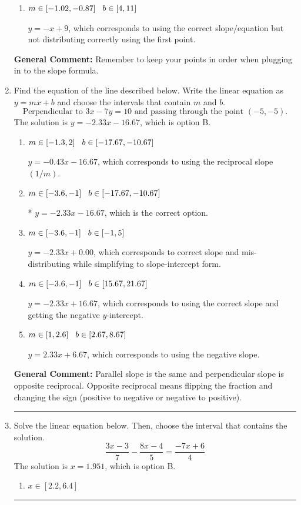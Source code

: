 \documentclass{extbook}[14pt]
\newcommand{\litem}[1]{\item #1

\rule{\textwidth}{0.4pt}}
\begin{document}
\begin{enumerate}
{\begin{enumerate}[label=\Alph*.]
 $y = -x -19$, which corresponds to using the correct slope/equation but not distributing correctly using the second point.
\item \( m \in [-1.02, -0.87] \hspace*{3mm} b \in [4, 11] \)

 $y = -x + 9$, which corresponds to using the correct slope/equation but not distributing correctly using the first point.
\end{enumerate}

\textbf{General Comment:} Remember to keep your points in order when plugging in to the slope formula.
}
\litem{
Find the equation of the line described below. Write the linear equation as $ y=mx+b $ and choose the intervals that contain $m$ and $b$.
\[ \text{Perpendicular to } 3 x - 7 y = 10 \text{ and passing through the point } (-5, -5). \]The solution is \( y = -2.33x - 16.67 \), which is option B.\begin{enumerate}[label=\Alph*.]
\item \( m \in [-1.3, 2] \hspace*{3mm} b \in [-17.67, -10.67] \)

 $y = -0.43x - 16.67$, which corresponds to using the reciprocal slope $(1/m)$.
\item \( m \in [-3.6, -1] \hspace*{3mm} b \in [-17.67, -10.67] \)

* $y = -2.33x - 16.67$, which is the correct option.
\item \( m \in [-3.6, -1] \hspace*{3mm} b \in [-1, 5] \)

 $y = -2.33x + 0.00$, which corresponds to correct slope and mis-distributing while simplifying to slope-intercept form.
\item \( m \in [-3.6, -1] \hspace*{3mm} b \in [15.67, 21.67] \)

 $y = -2.33x + 16.67$, which corresponds to using the correct slope and getting the negative $y$-intercept.
\item \( m \in [1, 2.6] \hspace*{3mm} b \in [2.67, 8.67] \)

 $y = 2.33x + 6.67$, which corresponds to using the negative slope.
\end{enumerate}

\textbf{General Comment:} Parallel slope is the same and perpendicular slope is opposite reciprocal. Opposite reciprocal means flipping the fraction and changing the sign (positive to negative or negative to positive).
}
\litem{
Solve the linear equation below. Then, choose the interval that contains the solution.
\[ \frac{3x -3}{7} - \frac{8x -4}{5} = \frac{-7x + 6}{4} \]The solution is \( x = 1.951 \), which is option B.\begin{enumerate}[label=\Alph*.]
\item \( x \in [2.2, 6.4] \)


\end{enumerate}}
\end{enumerate}
\end{document}
